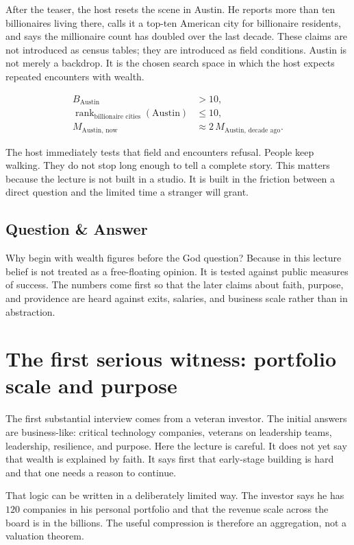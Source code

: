 After the teaser, the host resets the scene in Austin. He reports more than ten billionaires living there, calls it a top-ten American city for billionaire residents, and says the millionaire count has doubled over the last decade. These claims are not introduced as census tables; they are introduced as field conditions. Austin is not merely a backdrop. It is the chosen search space in which the host expects repeated encounters with wealth.

\begin{align}
B_{\text{Austin}} &> 10,\\
\operatorname{rank}_{\text{billionaire cities}}(\text{Austin}) &\le 10,\\
M_{\text{Austin, now}} &\approx 2\,M_{\text{Austin, decade ago}}.
\end{align}

The host immediately tests that field and encounters refusal. People keep walking. They do not stop long enough to tell a complete story. This matters because the lecture is not built in a studio. It is built in the friction between a direct question and the limited time a stranger will grant.

\subsection{Question \& Answer}

Why begin with wealth figures before the God question? Because in this lecture belief is not treated as a free-floating opinion. It is tested against public measures of success. The numbers come first so that the later claims about faith, purpose, and providence are heard against exits, salaries, and business scale rather than in abstraction.

\section{The first serious witness: portfolio scale and purpose}

The first substantial interview comes from a veteran investor. The initial answers are business-like: critical technology companies, veterans on leadership teams, leadership, resilience, and purpose. Here the lecture is careful. It does not yet say that wealth is explained by faith. It says first that early-stage building is hard and that one needs a reason to continue.

That logic can be written in a deliberately limited way. The investor says he has \(120\) companies in his personal portfolio and that the revenue scale across the board is in the billions. The useful compression is therefore an aggregation, not a valuation theorem.

